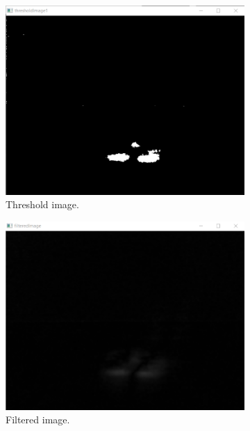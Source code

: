 \documentclass[a4paper,12pt]{report}
\begin{document}
\begin{figure}[h!]
	\begin{subfigure}[b]{0.4\linewidth}
    \includegraphics[width=\linewidth]{fig/img3.png}
    \caption{Threshold image.}
  \end{subfigure}
\hspace{0.5cm}
  \begin{subfigure}[b]{0.4\linewidth}
    \includegraphics[width=\linewidth]{fig/img4.png}
    \caption{Filtered image.}
  \end{subfigure}
  \begin{subfigure}[b]{0.4\linewidth}

\end{subfigure}
\end{figure}
\end{document}

